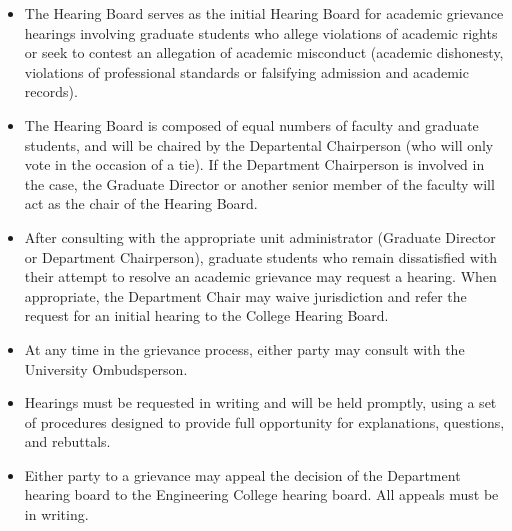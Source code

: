 \begin{itemize}

\item The Hearing Board serves as the initial Hearing Board for
academic grievance hearings involving graduate students who allege
violations of academic rights or seek to contest an allegation of
academic misconduct (academic dishonesty, violations of professional
standards or falsifying admission and academic records).

\item The Hearing Board is composed of equal numbers of faculty and
graduate students, and will be chaired by the Departental Chairperson
(who will only vote in the occasion of a tie).  If the Department
Chairperson is involved in the case, the Graduate Director or another
senior member of the faculty will act as the chair of the Hearing
Board.

\item After consulting with the appropriate unit administrator
(Graduate Director or Department Chairperson), graduate students who
remain dissatisfied with their attempt to resolve an academic
grievance may request a hearing. When appropriate, the Department
Chair may waive jurisdiction and refer the request for an initial
hearing to the College Hearing Board.

\item At any time in the grievance process, either party may consult
with the University Ombudsperson.

\item Hearings must be requested in writing and will be held promptly,
using a set of procedures designed to provide full opportunity for
explanations, questions, and rebuttals.

\item Either party to a grievance may appeal the decision of the
Department hearing board to the Engineering College hearing board. All
appeals must be in writing.

\end{itemize}


